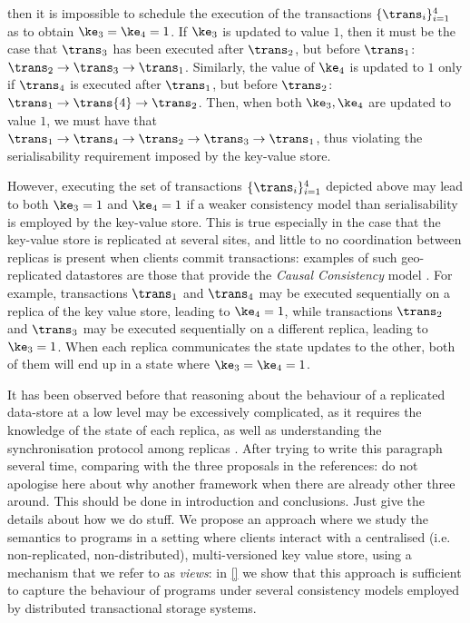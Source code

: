 then it is impossible to schedule the execution of the transactions $\{\trans_{i}\}_{i=1}^{4}$ 
as to obtain $\ke_3 = \ke_4 = 1$. 
If $\ke_3$ is updated to value $1$, then it must be the case that 
$\trans_3$ has been executed after  $\trans_2$, but before $\trans_1$: 
$\trans_2 \rightarrow \trans_{3} \rightarrow \trans_1$.
Similarly, the value of $\ke_4$ is updated 
to $1$ only if $\trans_4$ 
is executed after $\trans_1$, 
but before $\trans_2$: $\trans_{1} \rightarrow \trans{4} \rightarrow \trans_{2}$. 
Then, when both $\ke_3, \ke_4$ are updated to value $1$, we must have that 
$\trans_1 \rightarrow \trans_4 \rightarrow \trans_2 \rightarrow \trans_3 
\rightarrow \trans_1$, thus violating the serialisability requirement imposed by 
the key-value store. 

However, executing the set of transactions $\{\trans_{i}\}_{i=1}^{4}$ depicted above 
may lead to both $\ke_3 = 1$ and $\ke_4 = 1$ if a weaker consistency model than 
serialisability is employed by the key-value store. This is true especially in the case 
that the key-value store is replicated at several sites, and little to no coordination 
between replicas is present when clients commit transactions: examples of such geo-replicated 
datastores are those that provide the \emph{Causal Consistency} model \cite{cops}. 
For example, transactions $\trans_1$ and $\trans_4$ may be executed sequentially 
on a replica of the key value store, leading to $\ke_4 = 1$, while transactions 
$\trans_2$ and $\trans_3$ may be executed sequentially on a different replica, leading to $\ke_3 = 1$. 
When each replica communicates the state updates to the other, both of them will 
end up in a state where $\ke_3 = \ke_4 = 1$. 

It has been observed before that reasoning about the behaviour of a replicated data-store at a low level 
may be excessively complicated, as it requires the knowledge of the state of each 
replica, as well as understanding the synchronisation protocol among replicas \cite{framework-concur,adya,seebelieve}. 
\ac{After trying to write this paragraph several time, comparing with the three proposals in the references: 
do not apologise here about why another framework when there are already other three around. This should 
be done in introduction and conclusions. Just give the details about how we do stuff.} 
We propose an approach where we study the semantics to programs in a setting where 
clients interact with a centralised (i.e. non-replicated, non-distributed), multi-versioned key value store, 
using a mechanism that we refer to as \emph{views}: in \cref{} we show that this approach 
is sufficient to capture the behaviour of programs under several consistency models 
employed by distributed transactional storage systems.


